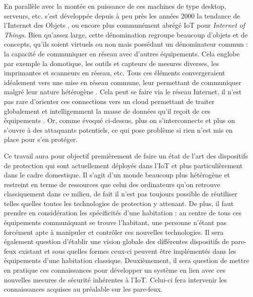\documentclass[]{article}
\begin{document}
\par En parallèle avec la montée en puissance de ces machines de type desktop, serveurs, etc. s'est développée depuis à peu près les années 2000 la tendance de l'\og Internet des Objets \fg{}, ou encore plus communément abrégé IoT pour \textit{Internet of Things}. Bien qu'assez large, cette dénomination regroupe beaucoup d'objets et de concepts, qu'ils soient virtuels ou non mais possédant un dénominateur commun : la capacité de communiquer en réseau avec d'autres équipements. Cela englobe par exemple la domotique, les outils et capteurs de mesures diverses, les imprimantes et scanneurs en réseau, etc. Tous ces éléments convergeraient idéalement vers une mise en réseau commune, leur permettant de communiquer malgré leur nature hétérogène \cite{Kubler2014}. Cela peut se faire via le réseau Internet, il n'est pas rare d'orienter ces connections vers un cloud permettant de traiter globalement et intelligemment la masse de données qu'il reçoit de ces équipements \cite{Huichen2016}. Or, comme évoqué ci-dessus, plus on s'interconnecte et plus on s'ouvre à des attaquants potentiels, ce qui pose problème si rien n'est mis en place pour s'en protéger.\\

\par Ce travail aura pour objectif premièrement de faire un état de l'art des dispositifs de protection qui sont actuellement déployés dans l'IoT et plus particulièrement dans le cadre domestique. Il s'agit d'un monde beaucoup plus hétérogène et restreint en terme de ressources que celui des ordinateurs qu'on retrouve classiquement dans ce milieu, de fait il n'est pas toujours possible de réutiliser telles quelles toutes les technologies de protection y attenant. De plus, il faut prendre en considération les spécificités d'une habitation : au centre de tous ces équipements communiquant se trouve l'habitant, une personne n'étant pas forcément apte à manipuler et contrôler ces nouvelles technologies. Il sera également question d'établir une vision globale des différentes dispositifs de pare-feux existant et sous quelles formes ceux-ci peuvent être implémentés dans les équipements d'une habitation classique. Deuxièmement, il sera question de mettre en pratique ces connaissances pour développer un système en lien avec ces nouvelles mesures de sécurité inhérentes à l'IoT. Celui-ci fera intervenir les connaissances acquises au préalable sur les pare-feux.
\newpage
\end{document}
